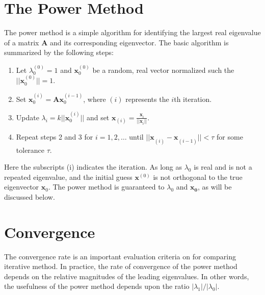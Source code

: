 \section{The Power Method}
The power method is a simple algorithm for identifying the largest real eigenvalue of a matrix $\mathbf{A}$ and its corresponding eigenvector. The basic algorithm is summarized by the following steps:
\begin{enumerate}
  \item Let $\lambda^{(0)}_0 =1 $ and $\mathbf{x}^{(0)}_0$ be a random, real vector normalized such the $||\mathbf{x}^{(0)}_0|| = 1$.
  \item Set $\mathbf{x}^{(i)}_0=\mathbf{A}\mathbf{x}^{(i-1)}_0$, where $(i)$ represents the $i$th iteration.
  \item Update $\lambda_{i} = k||\mathbf{x}^{(i)}_0||$ and set  $\mathbf{x}_{(i)} =\frac{\mathbf{x}^{}_{i}}{||\mathbf{x}^{}_{i}||}$.
  \item Repeat steps 2 and 3 for $i = 1, 2, \ldots$ until $||\mathbf{x}^{}_{(i)} - \mathbf{x}^{}_{(i-1)}|| < \tau$ for some tolerance $\tau$.
\end{enumerate}
Here the subscripts (i) indicates the iteration.
As long as $\lambda_0$ is real and is not a repeated eigenvalue, and the initial guess $\mathbf{x}^{(0)}$ is not orthogonal to the true eigenvector $\mathbf{x}_0$.
The power method is guaranteed to $\lambda_0$ and $\mathbf{x_0}$, as will be discussed below.
\section{Convergence}
The convergence rate is an important evaluation criteria on for comparing iterative method. 
In practice, the rate of convergence of the power method depends on the relative magnitudes of the leading eigenvalues. 
In other words, the usefulness of the power method depends upon the ratio $|\lambda_1|/|\lambda_0|$.

